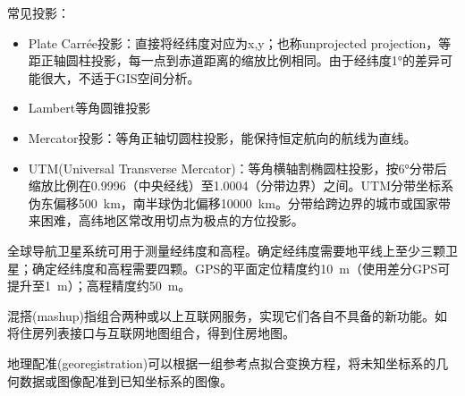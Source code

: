 \par 常见投影：
\begin{itemize}
    \item Plate Carr\'{e}e投影：直接将经纬度对应为x,y；也称unprojected projection，等距正轴圆柱投影，每一点到赤道距离的缩放比例相同。由于经纬度1°的差异可能很大，不适于GIS空间分析。
    \item Lambert等角圆锥投影
    \item Mercator投影：等角正轴切圆柱投影，能保持恒定航向的航线为直线。
    \item UTM(Universal Transverse Mercator)：等角横轴割椭圆柱投影，按6°分带后缩放比例在0.9996（中央经线）至1.0004（分带边界）之间。UTM分带坐标系伪东偏移\SI{500}{\kilo\metre}，南半球伪北偏移\SI{10000}{\kilo\metre}。分带给跨边界的城市或国家带来困难，高纬地区常改用切点为极点的方位投影。
\end{itemize}

\par 全球导航卫星系统可用于测量经纬度和高程。确定经纬度需要地平线上至少三颗卫星；确定经纬度和高程需要四颗。GPS的平面定位精度约\SI{10}{\metre}（使用差分GPS可提升至\SI{1}{\metre}）；高程精度约\SI{50}{\metre}。

\par 混搭(mashup)指组合两种或以上互联网服务，实现它们各自不具备的新功能。如将住房列表接口与互联网地图组合，得到住房地图。

\par 地理配准(georegistration)可以根据一组参考点拟合变换方程，将未知坐标系的几何数据或图像配准到已知坐标系的图像。